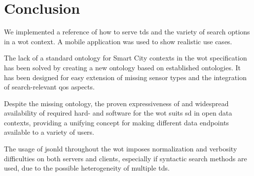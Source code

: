 \section{Conclusion}\label{sec:conclusion}

We implemented a reference of how to serve \glspl{td} and the variety of search options in a \gls{wot} context. A mobile application was used to show realistic use cases.

The lack of a standard ontology for Smart City contexts in the \gls{wot} specification has been solved by creating a new ontology based on established ontologies. It has been designed for easy extension of missing sensor types and the integration of search-relevant \gls{qos} aspects.

Despite the missing ontology, the proven expressiveness of and widespread availability of required hard- and software for the \gls{wot} suits \gls{sd} in open data contexts, providing a unifying concept for making different data endpoints available to a variety of users.

The usage of \gls{jsonld} throughout the \gls{wot} imposes normalization and verbosity difficulties on both servers and clients, especially if syntactic search methods are used, due to the possible heterogeneity of multiple \glspl{td}.
